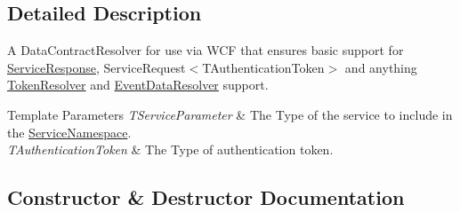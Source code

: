 \subsection{Detailed Description}
A Data\+Contract\+Resolver for use via W\+CF that ensures basic support for \hyperlink{classCqrs_1_1Services_1_1ServiceResponse}{Service\+Response}, Service\+Request$<$\+T\+Authentication\+Token$>$ and anything \hyperlink{classCqrs_1_1Services_1_1BasicServiceParameterResolver_a0ed208048d0f925dfa1e14fb73d82f0b_a0ed208048d0f925dfa1e14fb73d82f0b}{Token\+Resolver} and \hyperlink{classCqrs_1_1Services_1_1BasicServiceParameterResolver_a49d548e272010a9047bac9671e5b1f70_a49d548e272010a9047bac9671e5b1f70}{Event\+Data\+Resolver} support. 


\begin{DoxyTemplParams}{Template Parameters}
{\em T\+Service\+Parameter} & The Type of the service to include in the \hyperlink{classCqrs_1_1Services_1_1BasicServiceParameterResolver_a78d53a2ee367086bca9f2d2118746836_a78d53a2ee367086bca9f2d2118746836}{Service\+Namespace}.\\
\hline
{\em T\+Authentication\+Token} & The Type of authentication token.\\
\hline
\end{DoxyTemplParams}


\subsection{Constructor \& Destructor Documentation}
\mbox{\label{classCqrs_1_1Services_1_1BasicServiceParameterResolver_af82f43a2f64aa5c33a3692a2a689367b_af82f43a2f64aa5c33a3692a2a689367b}} 
